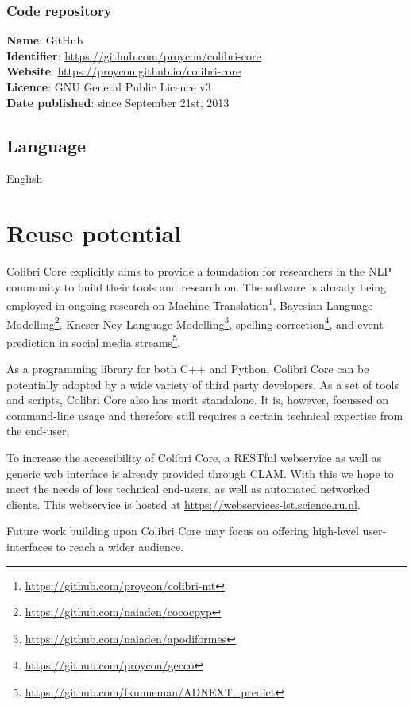 \documentclass[a4paper,12pt]{article}
\begin{document}
\subsubsection{Code repository}

\begin{addmargin}[2em]{2em}
\textbf{Name}: GitHub \\
\textbf{Identifier}: \url{https://github.com/proycon/colibri-core} \\
\textbf{Website}: \url{https://proycon.github.io/colibri-core} \\
\textbf{Licence}: GNU General Public Licence v3 \\
\textbf{Date published}: since September 21st, 2013 \\
\end{addmargin}

\subsection{Language}

English

\section{Reuse potential}

Colibri Core explicitly aims to provide a foundation for researchers in the NLP
community to build their tools and research on. The software is already being
employed in ongoing research on Machine
Translation\footnote{\url{https://github.com/proycon/colibri-mt}}, Bayesian Language
Modelling\footnote{\url{https://github.com/naiaden/cococpyp}}, Kneser-Ney Language
Modelling\footnote{\url{https://github.com/naiaden/apodiformes}}, spelling
correction\footnote{\url{https://github.com/proycon/gecco}}, and event
prediction in social media streams\footnote{\url{https://github.com/fkunneman/ADNEXT\_predict}}.

As a programming library for both C++ and Python, Colibri Core can be
potentially adopted by a wide variety of third party developers. As a set of
tools and scripts, Colibri Core also has merit standalone. It is, however,
focussed on command-line usage and therefore still requires a certain technical
expertise from the end-user.

To increase the accessibility of Colibri Core, a RESTful webservice as well as
generic web interface is already provided through CLAM\cite{CLAMPAPER}. With this we
hope to meet the needs of less technical end-users, as well as automated
networked clients. This webservice is hosted at
\url{https://webservices-lst.science.ru.nl}.

Future work building upon Colibri Core may focus on offering 
high-level user-interfaces to reach a wider audience.



\end{document}
